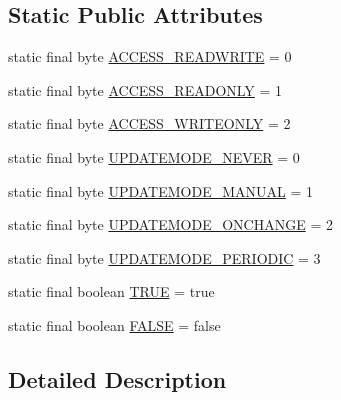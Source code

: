 \subsection*{\-Static \-Public \-Attributes}
\begin{DoxyCompactItemize}
\item 
static final byte \hyperlink{classorg_1_1taulabs_1_1uavtalk_1_1_u_a_v_object_meta_data_a44a12338675af0ecb539a87a976cac48}{\-A\-C\-C\-E\-S\-S\-\_\-\-R\-E\-A\-D\-W\-R\-I\-T\-E} = 0
\item 
static final byte \hyperlink{classorg_1_1taulabs_1_1uavtalk_1_1_u_a_v_object_meta_data_a3c2ab96994694c0e1fd3578b84644d18}{\-A\-C\-C\-E\-S\-S\-\_\-\-R\-E\-A\-D\-O\-N\-L\-Y} = 1
\item 
static final byte \hyperlink{classorg_1_1taulabs_1_1uavtalk_1_1_u_a_v_object_meta_data_a5f5fd42d243c55d5b5d1c657389cb56d}{\-A\-C\-C\-E\-S\-S\-\_\-\-W\-R\-I\-T\-E\-O\-N\-L\-Y} = 2
\item 
static final byte \hyperlink{classorg_1_1taulabs_1_1uavtalk_1_1_u_a_v_object_meta_data_a361f627b8e98cf0b4521954857e8b001}{\-U\-P\-D\-A\-T\-E\-M\-O\-D\-E\-\_\-\-N\-E\-V\-E\-R} = 0
\item 
static final byte \hyperlink{classorg_1_1taulabs_1_1uavtalk_1_1_u_a_v_object_meta_data_aab602b38cbe3e4aebba939b0c865e45a}{\-U\-P\-D\-A\-T\-E\-M\-O\-D\-E\-\_\-\-M\-A\-N\-U\-A\-L} = 1
\item 
static final byte \hyperlink{classorg_1_1taulabs_1_1uavtalk_1_1_u_a_v_object_meta_data_aa5ba43265fa65d0959aff2a0107944d3}{\-U\-P\-D\-A\-T\-E\-M\-O\-D\-E\-\_\-\-O\-N\-C\-H\-A\-N\-G\-E} = 2
\item 
static final byte \hyperlink{classorg_1_1taulabs_1_1uavtalk_1_1_u_a_v_object_meta_data_a0de23ed97539abcf565c1fdc46d47f80}{\-U\-P\-D\-A\-T\-E\-M\-O\-D\-E\-\_\-\-P\-E\-R\-I\-O\-D\-I\-C} = 3
\item 
static final boolean \hyperlink{classorg_1_1taulabs_1_1uavtalk_1_1_u_a_v_object_meta_data_afe6b13b38b4a68be0c61b04097472089}{\-T\-R\-U\-E} = true
\item 
static final boolean \hyperlink{classorg_1_1taulabs_1_1uavtalk_1_1_u_a_v_object_meta_data_a7a131f4c7a6d2b65f8dd71aa62631ecf}{\-F\-A\-L\-S\-E} = false
\end{DoxyCompactItemize}


\subsection{\-Detailed \-Description}



